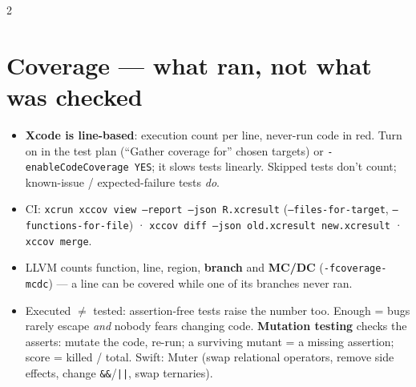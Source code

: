 \documentclass[8pt]{extarticle}
\newcommand\ct[1]{\texttt{#1}}
\begin{document}
\begin{multicols}{2}
\section{Coverage — what ran, not what was checked}
\noindent{}
\begin{itemize}
  \item \textbf{Xcode is line-based}: execution count per line, never-run code in red. Turn on
        in the test plan (``Gather coverage for'' chosen targets) or \ct{-enableCodeCoverage YES};
        it slows tests linearly. Skipped tests don't count; known-issue / expected-failure tests
        \emph{do}.
  \item CI: \ct{xcrun xccov view --report --json R.xcresult} (\ct{--files-for-target},
        \ct{--functions-for-file}) · \ct{xccov diff --json old.xcresult new.xcresult} ·
        \ct{xccov merge}.
  \item LLVM counts function, line, region, \textbf{branch} and \textbf{MC/DC}
        (\ct{-fcoverage-mcdc}) — a line can be covered while one of its branches never ran.
  \item Executed $\ne$ tested: assertion-free tests raise the number too. Enough = bugs rarely escape
        \emph{and} nobody fears changing code. \textbf{Mutation testing} checks the asserts:
        mutate the code, re-run; a surviving mutant = a missing assertion; score = killed /
        total. Swift: Muter (swap relational operators, remove side effects, change \ct{\&\&}/\ct{||},
        swap ternaries).
\end{itemize}


\end{multicols}
\end{document}
